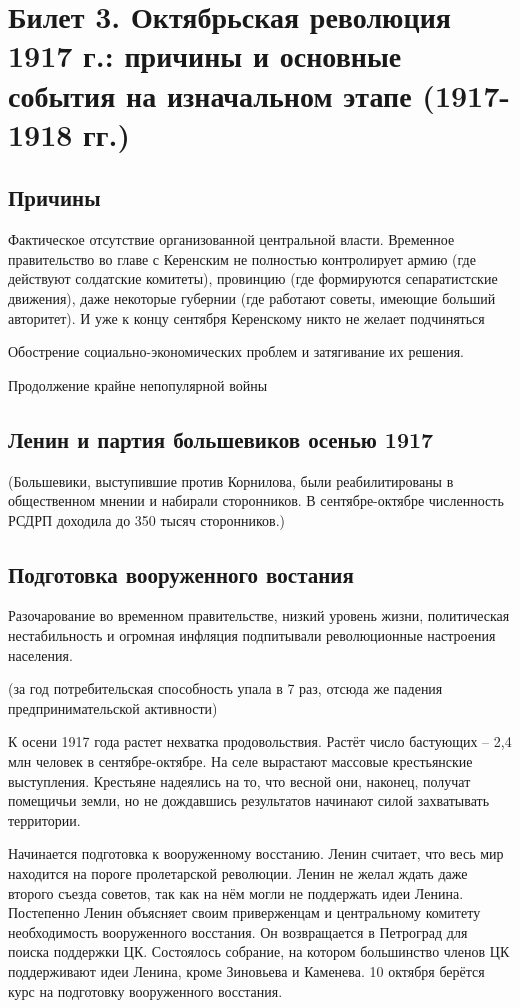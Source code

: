 \section{Билет 3. Октябрьская революция 1917 г.: причины и основные события на изначальном этапе (1917-1918 гг.)}

\subsection{Причины}

Фактическое отсутствие организованной центральной власти. Временное правительство во главе с Керенским не полностью контролирует армию (где действуют солдатские комитеты), провинцию (где формируются сепаратистские движения), даже некоторые губернии (где работают советы, имеющие больший авторитет). И уже к концу сентября Керенскому никто не желает подчиняться

Обострение социально-экономических проблем и затягивание их решения.

Продолжение крайне непопулярной войны


\subsection{Ленин и партия большевиков осенью 1917}

(Большевики, выступившие против Корнилова, были реабилитированы в общественном мнении и набирали сторонников. В сентябре-октябре численность РСДРП доходила до 350 тысяч сторонников.)

\subsection{Подготовка вооруженного востания}

Разочарование во временном правительстве, низкий уровень жизни, политическая нестабильность и огромная инфляция подпитывали революционные настроения населения.

(за год потребительская способность упала в 7 раз, отсюда же падения предпринимательской активности)

К осени 1917 года растет нехватка продовольствия. Растёт число бастующих – 2,4 млн человек в сентябре-октябре. На селе вырастают массовые крестьянские выступления. Крестьяне надеялись на то, что весной они, наконец, получат помещичьи земли, но не дождавшись результатов начинают силой захватывать территории.

Начинается подготовка к вооруженному восстанию. Ленин считает, что весь мир находится на пороге пролетарской революции. Ленин не желал ждать даже второго съезда советов, так как на нём могли не поддержать идеи Ленина. Постепенно Ленин объясняет своим приверженцам и центральному комитету необходимость вооруженного восстания. Он возвращается в Петроград для поиска поддержки ЦК. Состоялось собрание, на котором большинство членов ЦК поддерживают идеи Ленина, кроме Зиновьева и Каменева. 10 октября берётся курс на подготовку вооруженного восстания.

